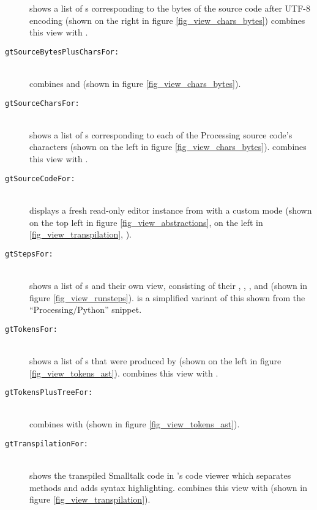 \begin{description}
	shows a list of s corresponding to the bytes of the source code after UTF-8 encoding (shown on the right in figure \ref{fig_view_chars_bytes})  combines this view with .
\item[\texttt{gtSourceBytesPlusCharsFor:}] \hfill \\
	combines  and  (shown in figure \ref{fig_view_chars_bytes}).
\item[\texttt{gtSourceCharsFor:}] \hfill \\
	shows a list of s corresponding to each of the Processing source code's characters (shown on the left in figure \ref{fig_view_chars_bytes}).  combines this view with .
\item[\texttt{gtSourceCodeFor:}] \hfill \\
	displays a fresh read-only editor instance from  with a custom  mode (shown on the top left in figure \ref{fig_view_abstractions}, on the left in \ref{fig_view_transpilation}, \etc).
\item[\texttt{gtStepsFor:}] \hfill \\
	shows a list of s and their own  view, consisting of their , , ,  and  (shown in figure \ref{fig_view_runsteps}).  is a simplified variant of this shown from the ``Processing/Python'' snippet.
\item[\texttt{gtTokensFor:}] \hfill \\
	shows a list of s that were produced by  (shown on the left in figure \ref{fig_view_tokens_ast}).  combines this view with .
\item[\texttt{gtTokensPlusTreeFor:}] \hfill \\
	combines  with  (shown in figure \ref{fig_view_tokens_ast}).
\item[\texttt{gtTranspilationFor:}] \hfill \\
	shows the transpiled Smalltalk code in 's code viewer which separates methods and adds syntax highlighting.  combines this view with  (shown in figure \ref{fig_view_transpilation}).

\end{description}
